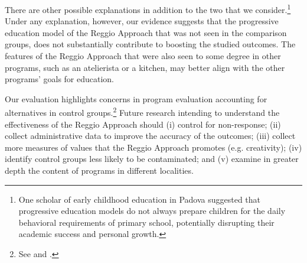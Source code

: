 There are other possible explanations in addition to the two that we consider.\footnote{One scholar of early childhood education in Padova suggested that progressive education models do not always prepare children for the daily behavioral requirements of primary school, potentially disrupting their academic success and personal growth.} Under any explanation, however, our evidence suggests that the progressive education model of the Reggio Approach that was not seen in the comparison groups, does not substantially contribute to boosting the studied outcomes. The features of the Reggio Approach that were also seen to some degree in other programs, such as an atelierista or a kitchen, may better align with the other programs' goals for education. 

Our evaluation highlights concerns in program evaluation accounting for alternatives in control groups.\footnote{See \cite{Heckman_Hohmann_etal_2000_QJE} and \cite{Kline_Walters_2016_QJE}.} Future research intending to understand the effectiveness of the Reggio Approach should (i) control for non-response; (ii) collect administrative data to improve the accuracy of the outcomes; (iii) collect more measures of values that the Reggio Approach promotes (e.g. creativity); (iv) identify control groups less likely to be contaminated; and (v) examine in greater depth the content of programs in different localities.




